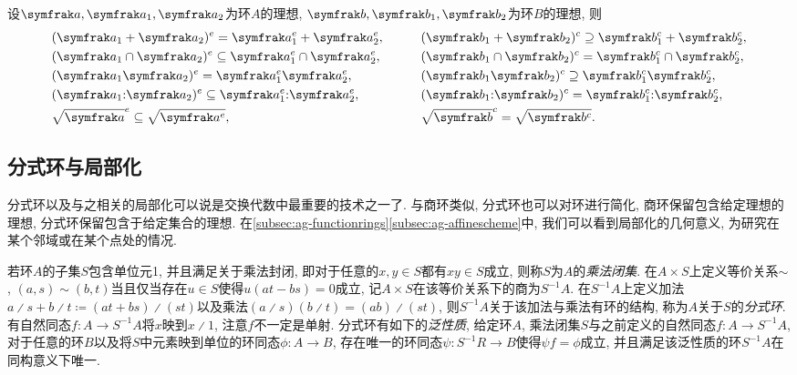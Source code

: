 \begin{proposition}\label{prop:extencontrop}
  设$\ideal{a}, \ideal{a}_1, \ideal{a}_2$为环$A$的理想, $\ideal{b}, \ideal{b}_1, \ideal{b}_2$为环$B$的理想, 则
  \begin{equation*}
    \begin{aligned}
      &(\ideal{a}_1+\ideal{a}_2)^e=\ideal{a}_1^e+\ideal{a}_2^e,
      &&\qquad(\ideal{b}_1+\ideal{b_2})^c\supseteq \ideal{b}_1^c+\ideal{b}_2^c,\\
      &(\ideal{a}_1\cap\ideal{a}_2)^e\subseteq\ideal{a}_1^e\cap\ideal{a}_2^e,
      &&\qquad(\ideal{b}_1\cap\ideal{b_2})^c= \ideal{b}_1^c\cap\ideal{b}_2^c,\\
      &(\ideal{a}_1\ideal{a}_2)^e=\ideal{a}_1^e\ideal{a}_2^e,
      &&\qquad(\ideal{b}_1\ideal{b_2})^c\supseteq\ideal{b}_1^c\ideal{b}_2^c,\\
      &(\ideal{a}_1{:}\ideal{a}_2)^e\subseteq\ideal{a}_1^e{:}\ideal{a}_2^e,
      &&\qquad(\ideal{b}_1{:}\ideal{b_2})^c= \ideal{b}_1^c{:}\ideal{b}_2^c,\\
      &\sqrt{\ideal{a}}^e\subseteq\sqrt{\ideal{a}^e},
      &&\qquad\sqrt{\ideal{b}}^c= \sqrt{\ideal{b}^c}.
    \end{aligned}
  \end{equation*}
\end{proposition}

\subsection{分式环与局部化}\label{subsec:algebra-localization}

分式环以及与之相关的局部化可以说是交换代数中最重要的技术之一了. 与商环类似, 分式环也可以对环进行简化, 商环保留包含给定理想的理想, 分式环保留包含于给定集合的理想. 在\ref{subsec:ag-functionrings}\ref{subsec:ag-affinescheme}中, 我们可以看到局部化的几何意义, 为研究在某个邻域或在某个点处的情况.

若环$A$的子集$S$包含单位元1, 并且满足关于乘法封闭, 即对于任意的$x, y\in S$都有$xy\in S$成立, 则称$S$为$A$的\emph{乘法闭集}. 在$A\times S$上定义等价关系${\sim}$, $(a, s)\sim (b, t)$当且仅当存在$u\in S$使得$u(at-bs)=0$成立, 记$A\times S$在该等价关系下的商为$S^{-1}A$. 在$S^{-1}A$上定义加法$a{\divslash} s+b{\divslash}t \coloneq  (at+bs){\divslash}(st)$以及乘法$(a{\divslash}s)(b{\divslash}t)=(ab){\divslash}(st)$, 则$S^{-1}A$关于该加法与乘法有环的结构, 称为$A$关于$S$的\emph{分式环}. 有自然同态$f\colon A\to S^{-1}A$将$x$映到$x{\divslash}1$, 注意$f$不一定是单射. 分式环有如下的\emph{泛性质}\parencites[81, Theorem 11.3]{altman_term_2017}[37, Proposition 3.1]{atiyah_introduction_1969}, 给定环$A$, 乘法闭集$S$与之前定义的自然同态$f\colon A\to S^{-1}A$, 对于任意的环$B$以及将$S$中元素映到单位的环同态$\phi\colon A\to B$, 存在唯一的环同态$\psi\colon S^{-1}R\to B$使得$\psi f=\phi$成立, 并且满足该泛性质的环$S^{-1}A$在同构意义下唯一.

